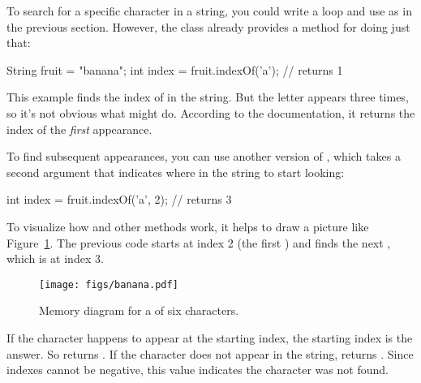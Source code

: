 
To search for a specific character in a string, you could write a  loop and use  as in the previous section.
However, the  class already provides a method for doing just that:

\begin{code}
String fruit = "banana";
int index = fruit.indexOf('a');     // returns 1
\end{code}

This example finds the index of  in the string.
But the letter appears three times, so it's not obvious what  might do.
According to the documentation, it returns the index of the {\em first} appearance.

To find subsequent appearances, you can use another version of , which takes a second argument that indicates where in the string to start looking:

\begin{code}
int index = fruit.indexOf('a', 2);  // returns 3
\end{code}

To visualize how  and other  methods work, it helps to draw a picture like Figure~\ref{fig.banana}.
The previous code starts at index 2 (the first ) and finds the next , which is at index 3.


\begin{figure}[!ht]
\begin{center}
\texttt{[image: figs/banana.pdf]}
\caption{Memory diagram for a  of six characters.}
\label{fig.banana}
\end{center}
\end{figure}


If the character happens to appear at the starting index, the starting index is the answer.
So  returns .
If the character does not appear in the string,  returns .
Since indexes cannot be negative, this value indicates the character was not found.

